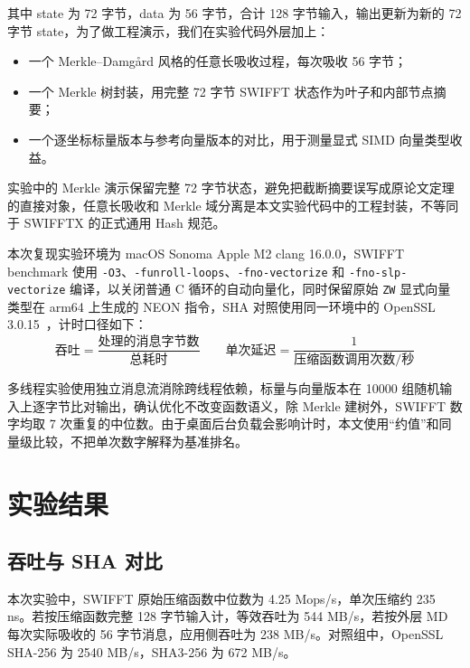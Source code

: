 \documentclass{article}
\begin{document}
其中 state 为 72 字节，data 为 56 字节，合计 128 字节输入，输出更新为新的 72 字节 state，为了做工程演示，我们在实验代码外层加上：

\begin{itemize}
    \item 一个 Merkle--Damg\aa rd 风格的任意长吸收过程，每次吸收 56 字节；
    \item 一个 Merkle 树封装，用完整 72 字节 SWIFFT 状态作为叶子和内部节点摘要；
    \item 一个逐坐标标量版本与参考向量版本的对比，用于测量显式 SIMD 向量类型收益。
\end{itemize}

实验中的 Merkle 演示保留完整 72 字节状态，避免把截断摘要误写成原论文定理的直接对象，任意长吸收和 Merkle 域分离是本文实验代码中的工程封装，不等同于 SWIFFTX 的正式通用 Hash 规范。

本次复现实验环境为 macOS Sonoma Apple M2 clang 16.0.0，SWIFFT benchmark 使用 \texttt{-O3}、\texttt{-funroll-loops}、\texttt{-fno-vectorize} 和 \texttt{-fno-slp-vectorize} 编译，以关闭普通 C 循环的自动向量化，同时保留原始 \texttt{ZW} 显式向量类型在 arm64 上生成的 NEON 指令，SHA 对照使用同一环境中的 OpenSSL 3.0.15~\cite{OpenSSL}，计时口径如下：
\[ \text{吞吐}=\frac{\text{处理的消息字节数}}{\text{总耗时}}\qquad\text{单次延迟}=\frac{1}{\text{压缩函数调用次数}/\text{秒}} \]

多线程实验使用独立消息流消除跨线程依赖，标量与向量版本在 10000 组随机输入上逐字节比对输出，确认优化不改变函数语义，除 Merkle 建树外，SWIFFT 数字均取 7 次重复的中位数。由于桌面后台负载会影响计时，本文使用“约值”和同量级比较，不把单次数字解释为基准排名。



\section{实验结果}
\subsection{吞吐与 SHA 对比}
本次实验中，SWIFFT 原始压缩函数中位数为 4.25 Mops/s，单次压缩约 235 ns。若按压缩函数完整 128 字节输入计，等效吞吐为 544 MB/s，若按外层 MD 每次实际吸收的 56 字节消息，应用侧吞吐为 238 MB/s。对照组中，OpenSSL SHA-256 为 2540 MB/s，SHA3-256 为 672 MB/s。
\end{document}
